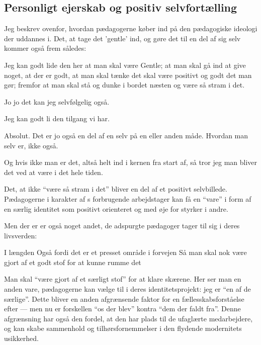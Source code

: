 \subsection{Personligt ejerskab og positiv selvfortælling}

Jeg beskrev ovenfor, hvordan pædagogerne køber ind på den pædagogiske ideologi der uddannes i.
Det, at tage det 'gentle' ind, og gøre det til en del af sig selv kommer også frem således:

\begin{description}

\AMB
Jeg kan godt lide den her at man skal være Gentle; at man skal gå ind at give noget, at der er godt, at man skal tænke det skal være positivt og godt det man gør; fremfor at man skal stå og dunke i bordet næsten og være så stram i det.

\DMC
Jo jo det kan jeg selvfølgelig også.

\AMB
Jeg kan godt li den tilgang vi har.

\DMC
Absolut. Det er jo også en del af en selv på en eller anden måde.
Hvordan man selv er, ikke også.

\AMB
Og hvis ikke man er det, altså helt ind i kernen fra start af, så tror jeg man bliver det ved at være i det hele tiden.
\end{description}

Det, at ikke “være så stram i det” bliver en del af et positivt selvbillede.
Pædagogerne i karakter af \citeauthor{baumanLiquidModernity2000}s forbrugende arbejdstager kan få en “vare” i form af en særlig identitet som positivt orienteret og med øje for styrker i andre.

Men der er er også noget andet, de adspurgte pædagoger tager til sig i deres livsverden:

\begin{description}

\AMB
I længden
Også fordi det er et presset område i forvejen
Så man skal nok være gjort af et godt stof for at kunne rumme det
\end{description}

Man skal “være gjort af et særligt stof” for at klare skærene.
Her ser man en anden vare, pædagogerne kan vælge til i deres identitetsprojekt: jeg er “en af de særlige”.
Dette bliver en anden afgrænsende faktor for en fællesskabsforståelse efter \citeauthor{baumanLiquidModernity2000} — men nu er forskellen “os der blev” kontra “dem der faldt fra”.
Denne afgrænsning har også den fordel, at den har plads til de ufaglærte medarbejdere, og kan skabe sammenhold og tilhørsfornemmelser i den flydende modernitets usikkerhed.

